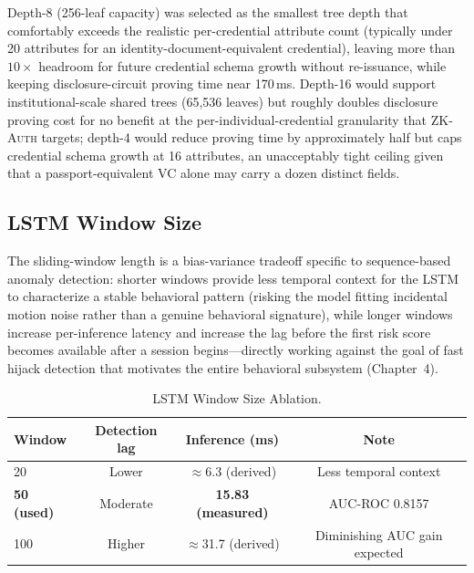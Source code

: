 \documentclass[12pt,a4paper,oneside]{report}
\begin{document}
Depth-8 (256-leaf capacity) was selected as the smallest tree depth that
comfortably exceeds the realistic per-credential attribute count
(typically under 20 attributes for an identity-document-equivalent
credential), leaving more than $10\times$ headroom for future credential
schema growth without re-issuance, while keeping disclosure-circuit
proving time near 170\,ms. Depth-16 would support institutional-scale
shared trees (65{,}536 leaves) but roughly doubles disclosure proving cost
for no benefit at the per-individual-credential granularity that
\textsc{ZK-Auth} targets; depth-4 would reduce proving time by
approximately half but caps credential schema growth at 16 attributes,
an unacceptably tight ceiling given that a passport-equivalent VC alone
may carry a dozen distinct fields.

\subsection{LSTM Window Size}

The sliding-window length is a bias-variance tradeoff specific to
sequence-based anomaly detection: shorter windows provide less temporal
context for the LSTM to characterize a stable behavioral pattern (risking
the model fitting incidental motion noise rather than a genuine
behavioral signature), while longer windows increase per-inference
latency and increase the lag before the first risk score becomes
available after a session begins---directly working against the goal of
fast hijack detection that motivates the entire behavioral subsystem
(Chapter~4).

\begin{table}[htbp]
\renewcommand{\arraystretch}{1.2}
\caption{LSTM Window Size Ablation.}
\label{tab:window_ablation}
\centering
\begin{tabular}{lccc}
\toprule
\textbf{Window} & \textbf{Detection lag} & \textbf{Inference (ms)} & \textbf{Note} \\
\midrule
20                  & Lower & $\approx$6.3 (derived)  & Less temporal context \\
\textbf{50 (used)}  & Moderate & \textbf{15.83 (measured)} & AUC-ROC 0.8157 \\
100                 & Higher & $\approx$31.7 (derived) & Diminishing AUC gain expected \\
\bottomrule
\end{tabular}
\end{table}
\end{document}
